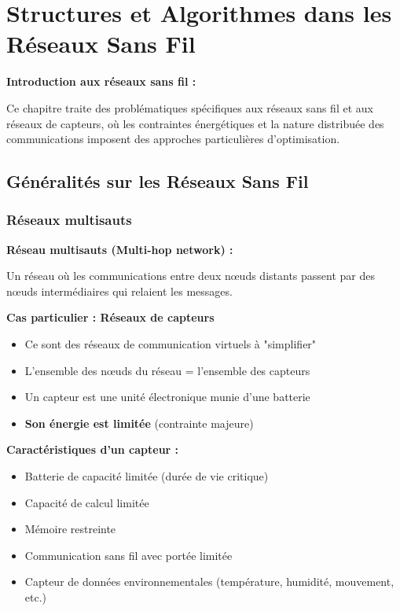 \documentclass[12pt,a4paper]{article}
\begin{document}
\newpage
\section{Structures et Algorithmes dans les Réseaux Sans Fil}

\begin{notecours}
\textbf{Introduction aux réseaux sans fil :}

Ce chapitre traite des problématiques spécifiques aux réseaux sans fil et aux réseaux de capteurs, où les contraintes énergétiques et la nature distribuée des communications imposent des approches particulières d'optimisation.
\end{notecours}

\subsection{Généralités sur les Réseaux Sans Fil}

\subsubsection{Réseaux multisauts}

\begin{definition}
\textbf{Réseau multisauts (Multi-hop network) :}

Un réseau où les communications entre deux nœuds distants passent par des nœuds intermédiaires qui relaient les messages.

\textbf{Cas particulier : Réseaux de capteurs}

\begin{itemize}
    \item Ce sont des réseaux de communication virtuels à "simplifier"
    \item L'ensemble des nœuds du réseau = l'ensemble des capteurs
    \item Un capteur est une unité électronique munie d'une batterie
    \item \textcolor{importantrouge}{\textbf{Son énergie est limitée}} (contrainte majeure)
\end{itemize}
\end{definition}

\begin{important}
\textbf{Caractéristiques d'un capteur :}
\begin{itemize}
    \item Batterie de capacité limitée (durée de vie critique)
    \item Capacité de calcul limitée
    \item Mémoire restreinte
    \item Communication sans fil avec portée limitée
    \item Capteur de données environnementales (température, humidité, mouvement, etc.)
\end{itemize}
\end{important}
\end{document}
